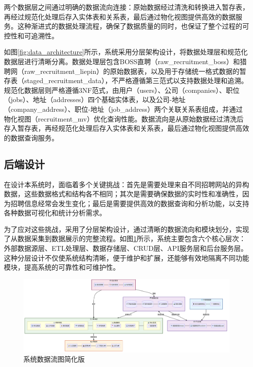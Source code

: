 两个数据层之间通过明确的数据流向连接：原始数据经过清洗和转换进入暂存表，再经过规范化处理后存入实体表和关系表，最后通过物化视图提供高效的数据服务。这种渐进式的数据处理流程，确保了数据质量的同时，也保证了整个过程的可控性和可追溯性。

如图\ref{fig:data_architecture}所示，系统采用分层架构设计，将数据处理层和规范化数据层进行清晰分离。数据处理层包含BOSS直聘（raw\_recruitment\_boss）和猎聘网（raw\_recruitment\_liepin）的原始数据表，以及用于存储统一格式数据的暂存表（staged\_recruitment\_data），不严格遵循第三范式以支持数据处理和追溯。规范化数据层则严格遵循3NF范式，由用户（users）、公司（companies）、职位（jobs）、地址（addresses）四个基础实体表，以及公司-地址（company\_address）、职位-地址（job\_address）两个关联关系表组成，并通过物化视图（recruitment\_mv）优化查询性能。数据流向是从原始数据经过清洗后存入暂存表，再经规范化处理后存入实体表和关系表，最后通过物化视图提供高效的数据查询服务。


\subsection{后端设计}

在设计本系统时，面临着多个关键挑战：首先是需要处理来自不同招聘网站的异构数据，这些数据格式和结构各不相同；其次是需要确保数据的实时性和准确性，因为招聘信息经常会发生变化；最后是需要提供高效的数据查询和分析功能，以支持各种数据可视化和统计分析需求。

为了应对这些挑战，采用了分层架构设计，通过清晰的数据流向和模块划分，实现了从数据采集到数据展示的完整流程。如图\ref{fig:system_dataflow_simplified}所示，系统主要包含六个核心层次：外部数据源层、ETL处理层、数据存储层、CRUD层、API服务层和后台服务层。这种分层设计不仅使系统结构清晰，便于维护和扩展，还能够有效地隔离不同功能模块，提高系统的可靠性和可维护性。

\begin{figure}[htbp]
    \centering
    \includegraphics[width=1.0\textwidth]{figures/系统数据流图简化版.png}
    \caption{系统数据流图简化版}
    \label{fig:system_dataflow_simplified}
\end{figure}



